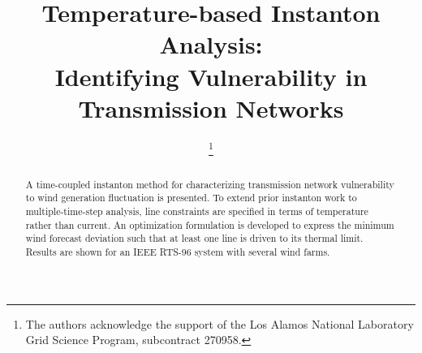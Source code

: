 \documentclass[conference]{IEEEtran}
\begin{document}
%
\title{Temperature-based Instanton Analysis: \\
Identifying Vulnerability in Transmission Networks}


\author{%

\and
{}
\and
{}

%

\thanks{The authors acknowledge the support of the Los Alamos National Laboratory Grid Science Program, subcontract 270958.}%
}

\maketitle

\begin{abstract}
A time-coupled instanton method for characterizing transmission network vulnerability to wind generation fluctuation is presented. To extend prior instanton work to multiple-time-step analysis, line constraints are specified in terms of temperature rather than current. An optimization formulation is developed to express the minimum wind forecast deviation such that at least one line is driven to its thermal limit. Results are shown for an IEEE RTS-96 system with several wind farms.
\end{abstract}
\end{document}
